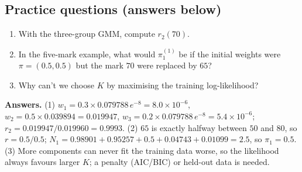 \documentclass[11pt,a4paper]{article}
\begin{document}
\subsection*{Practice questions (answers below)}
\begin{enumerate}
\item With the three-group GMM, compute $r_2(70)$.
\item In the five-mark example, what would $\pi_1^{(1)}$ be if the initial weights were $\pi=(0.5,0.5)$ but the mark $70$ were replaced by $65$?
\item Why can't we choose $K$ by maximising the training log-likelihood?
\end{enumerate}

\textbf{Answers.}
(1) $w_1=0.3\times0.079788\,e^{-8}=8.0\times10^{-6}$, $w_2=0.5\times0.039894=0.019947$, $w_3=0.2\times0.079788\,e^{-8}=5.4\times10^{-6}$; $r_2=0.019947/0.019960=0.9993$.
(2) $65$ is exactly halfway between $50$ and $80$, so $r=0.5/0.5$; $N_1=0.98901+0.95257+0.5+0.04743+0.01099=2.5$, so $\pi_1=0.5$.
(3) More components can never fit the training data worse, so the likelihood always favours larger $K$; a penalty (AIC/BIC) or held-out data is needed.
\end{document}
